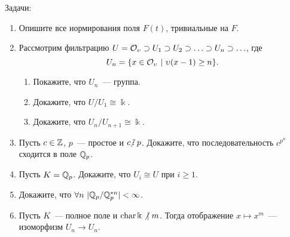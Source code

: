 	\begin{homework}
		Задачи:
		\begin{enumerate}
			\item Опишите все нормирования поля $F(t)$, тривиальные на $F$.

			\item Рассмотрим фильтрацию $U = \mathcal{O}_{\upsilon} \supset U_1 \supset U_2 \supset \ldots \supset U_n \supset \ldots$, где 
			\[
				U_n = \{ x \in \mathcal{O}_{\upsilon} \ \vert \ \upsilon(x - 1) \ge n \}. 
			\]
			\begin{enumerate}
				\item Покажите, что $U_n$~--- группа. 

				\item Докажите, что $U/U_1 \cong \Bbbk$. 

				\item Докажите, что $U_n/U_{n + 1} \cong \Bbbk$.
			\end{enumerate}

			\item Пусть $c \in \mathbb{Z}$, $p$~--- простое и $c \notdivby p$. Докажите, что последовательность $c^{p^n}$ сходится в поле $\mathbb{Q}_{p}$.

			\item Пусть $K = \mathbb{Q}_{p}$. Докажите, что $U_i \cong U$ при $i \ge 1$. 

			\item Докажите, что $\forall n \ |\Q_{p}/\Q_{p}^{*n}| < \infty$.

			\item Пусть $K$~--- полное поле и $\operatorname{char}{\Bbbk} \not\ \mid m$. Тогда отображение $x \mapsto x^m$~--- изоморфизм $U_n \to U_n$.
		\end{enumerate}
	\end{homework}




	

	

	

	

	